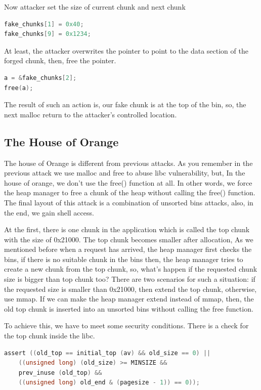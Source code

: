 \documentclass{masterthesis}
\newcommand*\ub{unsorted bins}
\begin{document}
Now attacker set the size of current chunk and next chunk

\begin{lstlisting}[language=c,frame=tlrb]
fake_chunks[1] = 0x40;
fake_chunks[9] = 0x1234;
\end{lstlisting}

At least, the attacker overwrites the pointer to point to the data section of the forged chunk, then, free the pointer.

\begin{lstlisting}[language=c,frame=tlrb]
a = &fake_chunks[2];
free(a);
\end{lstlisting}

The result of such an action is, our fake chunk is at the top of the bin, so, the next malloc return to the attacker's controlled location.

\subsection{The House of Orange}
The house of Orange is different from previous attacks. As you remember in the previous attack we use malloc and free to abuse libc vulnerability, but, In the house of orange, we don’t use the free() function at all. In other words, we force the heap manager to free a chunk of the heap without calling the free() function. The final layout of this attack is a combination of \ub{} attacks, also, in the end, we gain shell access.

At the first, there is one chunk in the application which is called the top chunk with the size of 0x21000. The top chunk becomes smaller after allocation, As we mentioned before when a request has arrived, the heap manager first checks the bins, if there is no suitable chunk in the bins then, the heap manager tries to create a new chunk from the top chunk, so, what’s happen if the requested chunk size is bigger than top chunk too? There are two scenarios for such a situation: if the requested size is smaller than 0x21000, then extend the top chunk, otherwise, use mmap. If we can make the heap manager extend instead of mmap, then, the old top chunk is inserted into an \ub{} without calling the free function.

To achieve this, we have to meet some security conditions. There is a check for the top chunk inside the libc. 
\begin{lstlisting}[language=c,frame=tlrb]
 assert ((old_top == initial_top (av) && old_size == 0) ||
	((unsigned long) (old_size) >= MINSIZE &&
	prev_inuse (old_top) &&
	((unsigned long) old_end & (pagesize - 1)) == 0));
\end{lstlisting}
\end{document}
